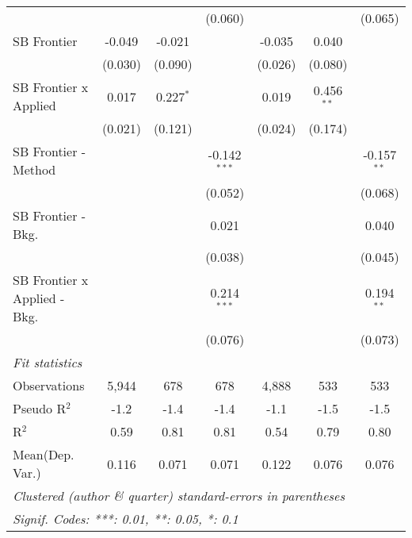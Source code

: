 \begin{tabular}{lcccccc}
                                  &         &              & (0.060)        &         &                & (0.065)\\   
   SB Frontier                    & -0.049  & -0.021       &                & -0.035  & 0.040          &   \\   
                                  & (0.030) & (0.090)      &                & (0.026) & (0.080)        &   \\   
   SB Frontier x Applied          & 0.017   & 0.227$^{*}$  &                & 0.019   & 0.456$^{**}$   &   \\   
                                  & (0.021) & (0.121)      &                & (0.024) & (0.174)        &   \\   
   SB Frontier - Method           &         &              & -0.142$^{***}$ &         &                & -0.157$^{**}$\\   
                                  &         &              & (0.052)        &         &                & (0.068)\\   
   SB Frontier - Bkg.             &         &              & 0.021          &         &                & 0.040\\   
                                  &         &              & (0.038)        &         &                & (0.045)\\   
   SB Frontier x Applied - Bkg.   &         &              & 0.214$^{***}$  &         &                & 0.194$^{**}$\\   
                                  &         &              & (0.076)        &         &                & (0.073)\\   
   \midrule
   \emph{Fit statistics}\\
   Observations                   & 5,944   & 678          & 678            & 4,888   & 533            & 533\\  
   Pseudo R$^2$                   & -1.2    & -1.4         & -1.4           & -1.1    & -1.5           & -1.5\\  
   R$^2$                          & 0.59    & 0.81         & 0.81           & 0.54    & 0.79           & 0.80\\  
Mean(Dep. Var.) & 0.116 & 0.071 & 0.071 & 0.122 & 0.076 & 0.076 \\
   \midrule \midrule
   \multicolumn{7}{l}{\emph{Clustered (author \& quarter) standard-errors in parentheses}}\\
   \multicolumn{7}{l}{\emph{Signif. Codes: ***: 0.01, **: 0.05, *: 0.1}}\\
\end{tabular}
\par\endgroup
